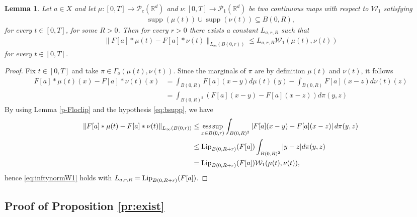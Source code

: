 \documentclass[A4paper,11pt]{article}
\newtheorem{lemma}[theorem]{Lemma}
\theoremstyle{definition}
\newcommand{\Lip}{\textup{Lip}}
\newcommand{\R}{\mathbb{R}}
\newcommand{\W}{\mathcal{W}}
\newcommand{\PP}{\mathcal{P}_1}
\DeclareMathOperator{\supp}{supp}
\DeclareMathOperator*{\esssup}{ess\,sup}
\begin{document}
\begin{lemma}\label{p-lipkernel}
Let $a \in X$ and let $\mu:[0,T] \rightarrow \mathcal{P}_c(\R^d)$ and $\nu: [0,T] \to \PP(\R^d)$ be two continuous maps with respect to $\W_1$ satisfying
\begin{align}\label{eq:bsupp}
\supp(\mu(t)) \cup \supp(\nu(t)) \subseteq B(0,R),
\end{align}
for every $t \in [0,T]$, for some $R > 0$. Then for every $r > 0$ there exists a constant $L_{a,r,R}$ such that
\begin{align}\label{eq:inftynormW1}
\|F[a] * \mu(t) - F[a] * \nu(t)\|_{L_{\infty}(B(0,r))} \leq L_{a,r,R} \W_1(\mu(t),\nu(t))
\end{align}
for every $t \in [0,T]$.
\end{lemma}
\begin{proof}
Fix $t \in [0,T]$ and take $\pi \in \Gamma_o(\mu(t),\nu(t))$. Since the marginals of $\pi$ are by definition $\mu(t)$ and $\nu(t)$, it follows
\begin{align*}
F[a] * \mu(t)(x) - F[a] * \nu(t)(x) &= \int_{B(0,R)} F[a](x-y) d\mu(t)(y) - \int_{B(0,R)} F[a](x-z) d\nu(t)(z)  \\
&= \int_{B(0,R)^2} \left(F[a](x-y) - F[a](x-z)\right) d\pi(y,z)
\end{align*}
By using Lemma \ref{p-Floclip} and the hypothesis \eqref{eq:bsupp}, we have
\begin{align*}
\|F[a] * \mu(t) - F[a] * \nu(t)\|_{L_{\infty}(B(0,r))} &\leq \esssup_{x \in B(0,r)} \int_{B(0,R)^2} \left|F[a](x-y) - F[a](x-z)\right| d\pi(y,z) \\
&\leq \Lip_{B(0,R+r)}(F[a]) \int_{B(0,R)^2} |y - z| d\pi(y,z) \\
&= \Lip_{B(0,R+r)}(F[a]) \W_1(\mu(t),\nu(t)),
\end{align*}
hence \eqref{eq:inftynormW1} holds with $L_{a,r,R} = \Lip_{B(0,R+r)}(F[a])$.
\end{proof}


\subsection{Proof of Proposition \ref{pr:exist}}\label{ap2}
\end{document}
